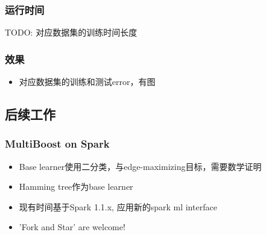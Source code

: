 \documentclass{beamer}
\begin{document}
\begin{frame}
\frametitle{运行时间}
TODO: 对应数据集的训练时间长度
\end{frame}

\begin{frame}
\frametitle{效果}
\begin{itemize}
\item 对应数据集的训练和测试error，有图
\end{itemize}
\end{frame}


\subsection{后续工作}

\begin{frame}
\frametitle{MultiBoost on Spark}
\begin{itemize}
\item Base learner使用二分类，与edge-maximizing目标，需要数学证明
\item Hamming tree作为base learner
\item 现有时间基于Spark 1.1.x, 应用新的spark ml interface
\item 'Fork and Star' are welcome!
\end{itemize}
\end{frame}
\end{document}
